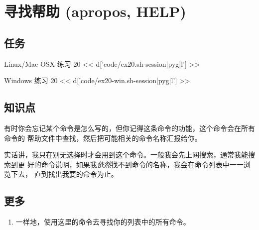 \chapter{寻找帮助 (apropos, HELP)}

\section{任务}

\begin{code}{Linux/Mac OSX 练习 20}
<< d['code/ex20.sh-session|pyg|l'] >>
\end{code}

\begin{code}{Windows 练习 20}
<< d['code/ex20-win.sh-session|pyg|l'] >>
\end{code}

\section{知识点}

有时你会忘记某个命令是怎么写的，但你记得这条命令的功能，这个命令会在所有命令的
帮助文件中查找，然后把可能相关的命令名称汇报给你。

实话讲，我只在别无选择时才会用到这个命令。一般我会先上网搜索，通常我能搜索到更
好的命令说明，如果我\emph{依然}找不到命令的名称，我会在命令列表中一一浏览下去，
直到找出我要的命令为止。

\section{更多}

\begin{enumerate}
\item 一样地，使用这里的命令去寻找你的列表中的所有命令。
\end{enumerate}

